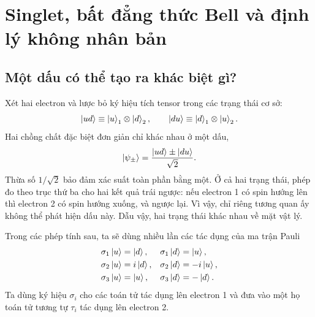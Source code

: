 \chapter{Singlet, bất đẳng thức Bell và định lý không nhân bản}


\section{Một dấu có thể tạo ra khác biệt gì?}

Xét hai electron và lược bỏ ký hiệu tích tensor trong các trạng thái cơ sở:
\begin{equation}
  \left\lvert ud\right\rangle\equiv\left\lvert u\right\rangle_1\otimes\left\lvert d\right\rangle_2,
  \qquad
  \left\lvert du\right\rangle\equiv\left\lvert d\right\rangle_1\otimes\left\lvert u\right\rangle_2.
\end{equation}
Hai chồng chất đặc biệt đơn giản chỉ khác nhau ở một dấu,
\begin{equation}
  \left\lvert\psi_\pm\right\rangle
  =
  \frac{\left\lvert ud\right\rangle\pm\left\lvert du\right\rangle}{\sqrt2}.
  \label{eq:l05-two-signs}
\end{equation}
Thừa số \(1/\sqrt2\) bảo đảm xác suất toàn phần bằng một. Ở cả hai trạng thái, phép đo theo trục thứ ba cho hai kết quả trái ngược: nếu electron 1 có spin hướng lên thì electron 2 có spin hướng xuống, và ngược lại. Vì vậy, chỉ riêng tương quan ấy không thể phát hiện dấu này. Dẫu vậy, hai trạng thái khác nhau về mặt vật lý.

Trong các phép tính sau, ta sẽ dùng nhiều lần các tác dụng của ma trận Pauli
\begin{align}
  \sigma_1\left\lvert u\right\rangle&=\left\lvert d\right\rangle,&
  \sigma_1\left\lvert d\right\rangle&=\left\lvert u\right\rangle,\nonumber\\
  \sigma_2\left\lvert u\right\rangle&=i\left\lvert d\right\rangle,&
  \sigma_2\left\lvert d\right\rangle&=-i\left\lvert u\right\rangle,\nonumber\\
  \sigma_3\left\lvert u\right\rangle&=\left\lvert u\right\rangle,&
  \sigma_3\left\lvert d\right\rangle&=-\left\lvert d\right\rangle.
  \label{eq:l05-pauli-actions}
\end{align}
Ta dùng ký hiệu \(\sigma_i\) cho các toán tử tác dụng lên electron 1 và đưa vào một họ toán tử tương tự \(\tau_i\) tác dụng lên electron 2.

